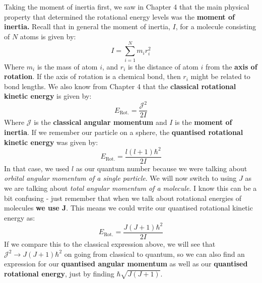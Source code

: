 \documentclass{memoir}[11pt,oneside,a4paper,openany]
\begin{document}
Taking the moment of inertia first, we saw in Chapter 4 that the main physical property that determined the rotational energy levels was the \textbf{moment of inertia.} Recall that in general the moment of inertia, $I$, for a molecule consisting of $N$ atoms is given by:
\begin{equation}
	I = \sum_{i=1}^N m_ir_i^2
\end{equation}
Where $m_i$ is the mass of atom $i$, and $r_i$ is the distance of atom $i$ from the \textbf{axis of rotation}. If the axis of rotation is a chemical bond, then $r_i$  might be related to bond lengths. We also know from Chapter 4 that the \textbf{classical rotational kinetic energy} is given by:
\begin{equation}
	E_{\text{Rot.}} = \frac{\mathcal{J}^2}{2I}
\end{equation}
Where $\mathcal{J}$ is the \textbf{classical angular momentum} and $I$ is the \textbf{moment of inertia}. If we remember our particle on a sphere, the \textbf{quantised rotational kinetic energy} was given by:
\begin{equation}
	E_{\text{Rot.}} = \frac{l(l+1)\hbar^2}{2I}
\end{equation}
In that case, we used $l$ as our quantum number because we were talking about \emph{orbital angular momentum of a single particle}. We will now switch to using $J$ as we are talking about \emph{total angular momentum of a molecule}. I know this can be a bit confusing - just remember that when we talk about rotational energies of molecules \textbf{we use J}. This means we could write our quantised rotational kinetic energy as:
\begin{equation}
	E_{\text{Rot.}} = \frac{J(J+1)\hbar^2}{2I}
\end{equation}
If we compare this to the classical expression above, we will see that $\mathcal{J}^2 \rightarrow J(J+1)\hbar^2$ on going from classical to quantum, so we can also find an expression for our \textbf{quantised angular momentum} as well as our \textbf{quantised rotational energy}, just by finding $\hbar\sqrt{J(J+1)}$. 
\end{document}
